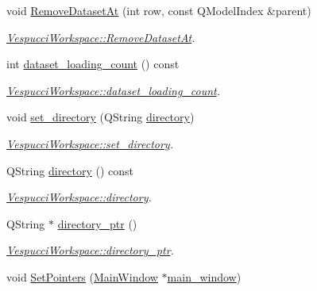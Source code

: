 \begin{DoxyCompactItemize}
\item 
void \hyperlink{class_vespucci_workspace_a8d63989aff6c87ea4fd2468a7ef62352}{Remove\+Dataset\+At} (int row, const Q\+Model\+Index \&parent)
\begin{DoxyCompactList}\small\item\em \hyperlink{class_vespucci_workspace_a8d63989aff6c87ea4fd2468a7ef62352}{Vespucci\+Workspace\+::\+Remove\+Dataset\+At}. \end{DoxyCompactList}\item 
int \hyperlink{class_vespucci_workspace_a330132202e0dcc599d5ef892d2f52eb4}{dataset\+\_\+loading\+\_\+count} () const 
\begin{DoxyCompactList}\small\item\em \hyperlink{class_vespucci_workspace_a330132202e0dcc599d5ef892d2f52eb4}{Vespucci\+Workspace\+::dataset\+\_\+loading\+\_\+count}. \end{DoxyCompactList}\item 
void \hyperlink{class_vespucci_workspace_afb93dcaa201f7ee3a847154a4ddbcbbc}{set\+\_\+directory} (Q\+String \hyperlink{class_vespucci_workspace_a1cf453891cf654c9117338490a5ea5ba}{directory})
\begin{DoxyCompactList}\small\item\em \hyperlink{class_vespucci_workspace_afb93dcaa201f7ee3a847154a4ddbcbbc}{Vespucci\+Workspace\+::set\+\_\+directory}. \end{DoxyCompactList}\item 
Q\+String \hyperlink{class_vespucci_workspace_a1cf453891cf654c9117338490a5ea5ba}{directory} () const 
\begin{DoxyCompactList}\small\item\em \hyperlink{class_vespucci_workspace_a1cf453891cf654c9117338490a5ea5ba}{Vespucci\+Workspace\+::directory}. \end{DoxyCompactList}\item 
Q\+String $\ast$ \hyperlink{class_vespucci_workspace_a6de7f2e3c03a97e22d78df1213ee61bf}{directory\+\_\+ptr} ()
\begin{DoxyCompactList}\small\item\em \hyperlink{class_vespucci_workspace_a6de7f2e3c03a97e22d78df1213ee61bf}{Vespucci\+Workspace\+::directory\+\_\+ptr}. \end{DoxyCompactList}\item 
void \hyperlink{class_vespucci_workspace_a76edf2cc6e068dfe8af74e8fdd89d33b}{Set\+Pointers} (\hyperlink{class_main_window}{Main\+Window} $\ast$\hyperlink{class_vespucci_workspace_a48a0bc8ab860ca6a66e7eaf9b803b78a}{main\+\_\+window})

\end{DoxyCompactItemize}
